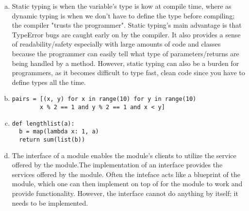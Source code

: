 \documentclass[12pt]{article}
\begin{document}
\begin{enumerate}[a)]
\item
Static typing is when the variable's type is kow at compile time, where as dynamic typing is when we don't have to define the type before compiling; the compiler "trusts the programmer". Static typing's main advantage is that TypeError bugs are caught early on by the compiler. It also provides a sense of readability/safety especially with large amounts of code and classes because the programmer can easily tell what type of parameters/returns are being handled by a method. However, static typing can also be a burden for programmers, as it becomes difficult to type fast, clean code since you have to define types all the time.

\item
\begin{lstlisting}
pairs = [(x, y) for x in range(10) for y in range(10) 
		x % 2 == 1 and y % 2 == 1 and x < y]
\end{lstlisting}

\item
\begin{lstlisting}
def lengthlist(a):
  b = map(lambda x: 1, a)
  return sum(list(b))
\end{lstlisting}

\item
The interface of a module enables the module's clients to utilize the service offered by the module.The implementation of an interface provides the services offered by the module. Often the inteface acts like a blueprint of the module, which one can then implement on top of for the module to work and provide functionality. However, the interface cannot do anything by itself; it needs to be implemented.


\end{enumerate}
\end{document}
